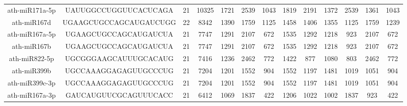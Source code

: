 \begin{landscape}
\begin{table}[]
\begin{tabular}{ccccccccccccc}
    ath-miR171a-5p   & UAUUGGCCUGGUUCACUCAGA    & 21           & 10325        & 1721             & 2539         & 1043                         & 1819                 & 2191                 & 1372                  & 2539                  & 1361                  & 1043                  \\
    ath-miR167d      & UGAAGCUGCCAGCAUGAUCUGG   & 22           & 8342         & 1390             & 1759         & 1125                         & 1458                 & 1406                 & 1355                  & 1125                  & 1759                  & 1239                  \\
    ath-miR167a-5p   & UGAAGCUGCCAGCAUGAUCUA    & 21           & 7747         & 1291             & 2107         & 672                          & 1535                 & 1292                 & 1218                  & 923                   & 2107                  & 672                   \\
    ath-miR167b      & UGAAGCUGCCAGCAUGAUCUA    & 21           & 7747         & 1291             & 2107         & 672                          & 1535                 & 1292                 & 1218                  & 923                   & 2107                  & 672                   \\
    ath-miR822-5p    & UGCGGGAAGCAUUUGCACAUG    & 21           & 7416         & 1236             & 2462         & 772                          & 1422                 & 877                  & 1080                  & 803                   & 2462                  & 772                   \\
    ath-miR399b      & UGCCAAAGGAGAGUUGCCCUG    & 21           & 7204         & 1201             & 1552         & 904                          & 1552                 & 1197                 & 1481                  & 1019                  & 1051                  & 904                   \\
    ath-miR399c-3p   & UGCCAAAGGAGAGUUGCCCUG    & 21           & 7204         & 1201             & 1552         & 904                          & 1552                 & 1197                 & 1481                  & 1019                  & 1051                  & 904                   \\
    ath-miR167a-3p   & GAUCAUGUUCGCAGUUUCACC    & 21           & 6412         & 1069             & 1837         & 422                          & 1206                 & 1022                 & 1002                  & 1837                  & 923                   & 422                   \\

\end{tabular}
\end{table}
\end{landscape}
